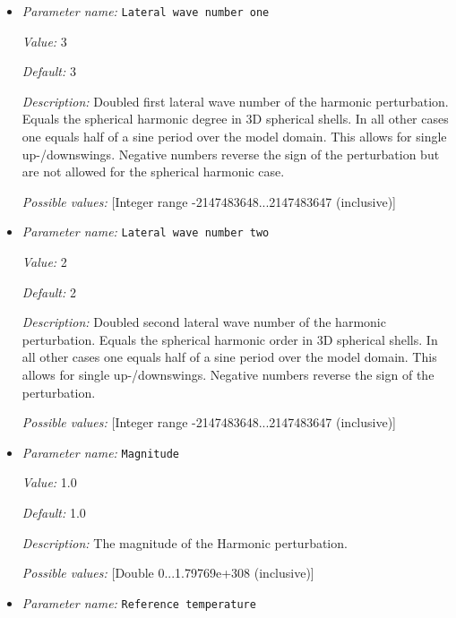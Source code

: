 \begin{itemize}
\item {\it Parameter name:} {\tt Lateral wave number one}
\label{parameters:Initial conditions/Harmonic perturbation/Lateral wave number one}


{\it Value:} 3


{\it Default:} 3


{\it Description:} Doubled first lateral wave number of the harmonic perturbation. Equals the spherical harmonic degree in 3D spherical shells. In all other cases one equals half of a sine period over the model domain. This allows for single up-/downswings. Negative numbers reverse the sign of the perturbation but are not allowed for the spherical harmonic case.


{\it Possible values:} [Integer range -2147483648...2147483647 (inclusive)]
\item {\it Parameter name:} {\tt Lateral wave number two}
\label{parameters:Initial conditions/Harmonic perturbation/Lateral wave number two}


{\it Value:} 2


{\it Default:} 2


{\it Description:} Doubled second lateral wave number of the harmonic perturbation. Equals the spherical harmonic order in 3D spherical shells. In all other cases one equals half of a sine period over the model domain. This allows for single up-/downswings. Negative numbers reverse the sign of the perturbation.


{\it Possible values:} [Integer range -2147483648...2147483647 (inclusive)]
\item {\it Parameter name:} {\tt Magnitude}
\label{parameters:Initial conditions/Harmonic perturbation/Magnitude}


{\it Value:} 1.0


{\it Default:} 1.0


{\it Description:} The magnitude of the Harmonic perturbation.


{\it Possible values:} [Double 0...1.79769e+308 (inclusive)]
\item {\it Parameter name:} {\tt Reference temperature}
\label{parameters:Initial conditions/Harmonic perturbation/Reference temperature}



\end{itemize}
